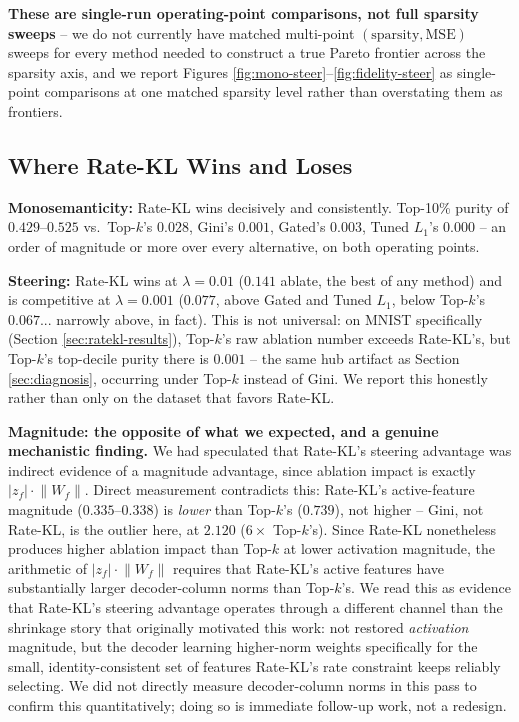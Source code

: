 \documentclass[11pt,twocolumn]{article}
\begin{document}
\textbf{These are single-run operating-point comparisons, not full sparsity sweeps} -- we do not currently have matched multi-point $(\text{sparsity}, \text{MSE})$ sweeps for every method needed to construct a true Pareto frontier across the sparsity axis, and we report Figures \ref{fig:mono-steer}--\ref{fig:fidelity-steer} as single-point comparisons at one matched sparsity level rather than overstating them as frontiers.

\subsection{Where Rate-KL Wins and Loses}
\textbf{Monosemanticity:} Rate-KL wins decisively and consistently. Top-10\% purity of $0.429$--$0.525$ vs.\ Top-$k$'s $0.028$, Gini's $0.001$, Gated's $0.003$, Tuned $L_1$'s $0.000$ -- an order of magnitude or more over every alternative, on both operating points.

\textbf{Steering:} Rate-KL wins at $\lambda{=}0.01$ ($0.141$ ablate, the best of any method) and is competitive at $\lambda{=}0.001$ ($0.077$, above Gated and Tuned $L_1$, below Top-$k$'s $0.067$... narrowly above, in fact). This is not universal: on MNIST specifically (Section \ref{sec:ratekl-results}), Top-$k$'s raw ablation number exceeds Rate-KL's, but Top-$k$'s top-decile purity there is $0.001$ -- the same hub artifact as Section \ref{sec:diagnosis}, occurring under Top-$k$ instead of Gini. We report this honestly rather than only on the dataset that favors Rate-KL.

\textbf{Magnitude: the opposite of what we expected, and a genuine mechanistic finding.} We had speculated that Rate-KL's steering advantage was indirect evidence of a magnitude advantage, since ablation impact is exactly $|z_f|\cdot\lVert W_f\rVert$. Direct measurement contradicts this: Rate-KL's active-feature magnitude ($0.335$--$0.338$) is \emph{lower} than Top-$k$'s ($0.739$), not higher -- Gini, not Rate-KL, is the outlier here, at $2.120$ ($6\times$ Top-$k$'s). Since Rate-KL nonetheless produces higher ablation impact than Top-$k$ at lower activation magnitude, the arithmetic of $|z_f|\cdot\lVert W_f\rVert$ requires that Rate-KL's active features have substantially larger decoder-column norms than Top-$k$'s. We read this as evidence that Rate-KL's steering advantage operates through a different channel than the shrinkage story that originally motivated this work: not restored \emph{activation} magnitude, but the decoder learning higher-norm weights specifically for the small, identity-consistent set of features Rate-KL's rate constraint keeps reliably selecting. We did not directly measure decoder-column norms in this pass to confirm this quantitatively; doing so is immediate follow-up work, not a redesign.
\end{document}

